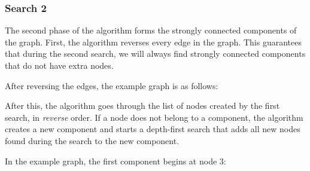 \subsubsection{Search 2}

The second phase of the algorithm
forms the strongly connected components
of the graph.
First, the algorithm reverses every
edge in the graph.
This guarantees that during the second search,
we will always find strongly connected
components that do not have extra nodes.

After reversing the edges,
the example graph is as follows:
\begin{center}
\end{center}

After this, the algorithm goes through
the list of nodes created by the first search,
in \emph{reverse} order.
If a node does not belong to a component,
the algorithm creates a new component
and starts a depth-first search
that adds all new nodes found during the search
to the new component.

In the example graph, the first component
begins at node 3:

